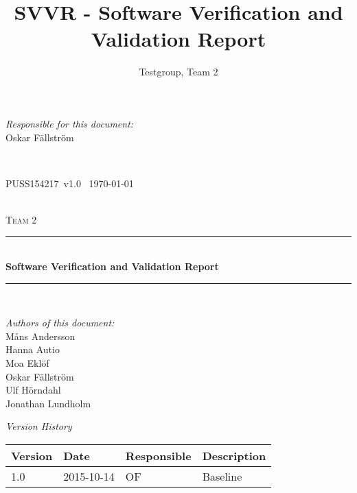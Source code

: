 \documentclass[a4paper]{article}
\title{SVVR - Software Verification and Validation Report}
\author{Testgroup, Team 2}
\newcommand{\version}{v1.0}
\newcommand{\SVVR}{PUSS154217}
\begin{document}
\begin{titlepage}
\newcommand{\HRule}{\rule{\linewidth}{0.5mm}}

\begin{minipage}{0.5\textwidth}
\begin{flushleft} %
\textit{Responsible for this document:}\\
Oskar Fällström %
\end{flushleft}
\end{minipage}
~
\begin{minipage}{0.4\textwidth}
\begin{flushright}
\SVVR\ \version\ %
\today
\end{flushright}
\end{minipage}\\[3cm]

\centering
\textsc{\LARGE Team 2}\\[0.5cm]

\HRule \\[0.4cm]
{ \huge \bfseries Software Verification and Validation Report}\\[0.4cm] %
\HRule \\[1.5cm]

\vfill
\begin{flushleft}
\textit{Authors of this document:}\\
Måns Andersson \\
Hanna Autio \\
Moa Eklöf \\
Oskar Fällström \\
Ulf Hörndahl \\
Jonathan Lundholm
\end{flushleft}	


\end{titlepage}

\begin{center}
\textit{\large Version History}

    \begin{tabular}{ | l | l | l | p{5cm} |}
    \hline
    \textbf{Version}		& \textbf{Date}		& \textbf{Responsible}					& \textbf{Description}					\\ \hline
    1.0						& 2015-10-14			& OF									& Baseline\\ \hline
    \end{tabular}
\end{center}
\end{document}
